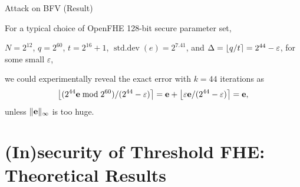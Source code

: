 \documentclass{beamer}
\begin{document}
    \begin{frame}{\krd Attack on BFV (Result)} 

    {

    For a typical choice of OpenFHE 128-bit secure parameter set, \vspace{0.3cm}
    
    $N = 2^{12}$, $q=2^{60}$, $t = 2^{16}+1$, $\operatorname{std.dev}(e) = 2^{7.41}$, and $\Delta = \left\lfloor q/t \right\rceil = 2^{44}-\varepsilon$, for some small $\varepsilon$, \vspace{0.3cm}
    
    we could experimentally reveal the exact error with $k=44$ iterations as
    \[
        \left\lfloor ({2^{44}\mathbf{e} \bmod 2^{60}})/(2^{44}-\varepsilon) \right\rceil = \mathbf{e} + \left\lfloor \varepsilon\mathbf{e} / (2^{44}-\varepsilon) \right\rceil = \mathbf{e},
    \]
    unless $\Vert\mathbf{e}\Vert_\infty$ is too huge. 
    }
    \end{frame}

 
\section{(In)security of Threshold FHE:\\ {\normalsize Theoretical Results}}


\end{document}
